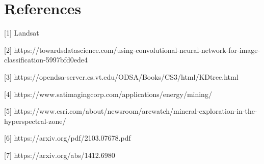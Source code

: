 \documentclass[10pt]{article}
\begin{document}

\section*{References}

\small

[1]  Landsat

[2] https://towardsdatascience.com/using-convolutional-neural-network-for-image-classification-5997bfd0ede4

[3] https://opendsa-server.cs.vt.edu/ODSA/Books/CS3/html/KDtree.html

[4] https://www.satimagingcorp.com/applications/energy/mining/

[5] https://www.esri.com/about/newsroom/arcwatch/mineral-exploration-in-the-hyperspectral-zone/

[6] https://arxiv.org/pdf/2103.07678.pdf

[7] https://arxiv.org/abs/1412.6980




\end{document}
